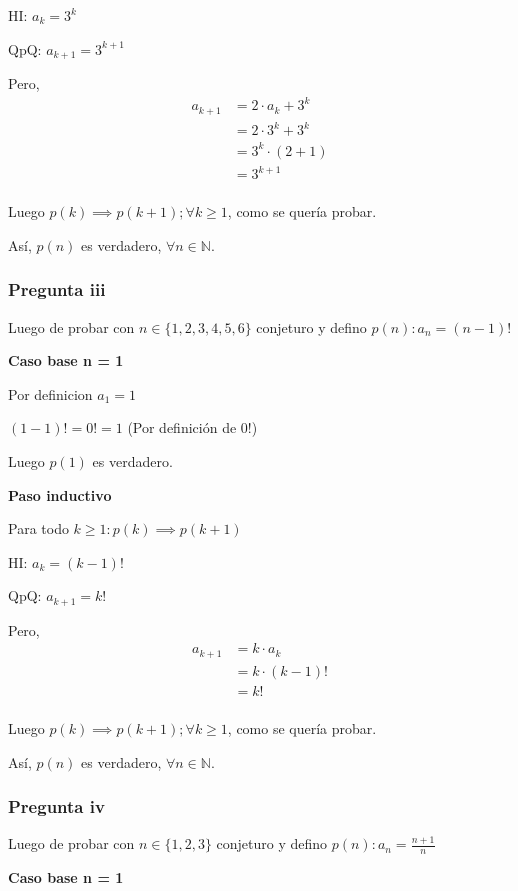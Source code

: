 HI: $ a_k = 3^k$

QpQ: $ a_{k+1} = 3^{k+1}$

Pero,
\begin{align*}
    a_{k+1} &= 2\cdot a_k + 3^k \\
    &= 2\cdot 3^k + 3^k \\
    &= 3^k\cdot (2+1) \\
    &= 3^{k+1} \\
\end{align*}

Luego $p(k) \implies p(k+1); \forall k \geq 1$, como se quería probar.

Así, $p(n)$ es verdadero, $\forall n \in \mathbb{N}$.

\subsubsection{Pregunta iii}

Luego de probar con $ n \in \{ 1,2,3,4,5,6 \} $ conjeturo y defino $ p(n): a_n = (n-1)! $

\textbf{Caso base n = 1}

Por definicion $ a_1 = 1$

$ (1-1)! = 0! = 1$ (Por definición de 0!)

Luego $ p(1) $ es verdadero.

\textbf{Paso inductivo}

Para todo $k \geq 1: p(k) \implies p(k+1)$

HI: $ a_k = (k-1)!$

QpQ: $ a_{k+1} = k!$

Pero,
\begin{align*}
    a_{k+1} &= k\cdot a_k \\
    &= k\cdot (k-1)! \\
    &= k! \\
\end{align*}

Luego $p(k) \implies p(k+1); \forall k \geq 1$, como se quería probar.

Así, $p(n)$ es verdadero, $\forall n \in \mathbb{N}$.

\subsubsection{Pregunta iv}

Luego de probar con $ n \in \{ 1,2,3 \} $ conjeturo y defino $ p(n): a_n = \frac{n+1}{n} $

\textbf{Caso base n = 1}

